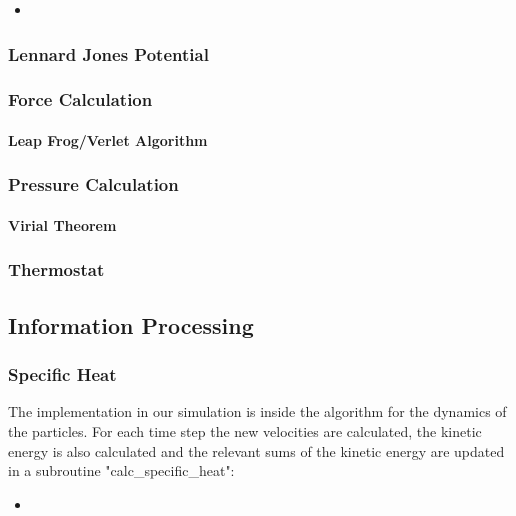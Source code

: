\documentclass[
10pt, %
a4paper, %
oneside, %
headinclude,footinclude, %
BCOR5mm, %
]{scrartcl}
\newcommand{\insertcode}[2]{\begin{itemize}\item[]\end{itemize}} %
\begin{document}
\insertcode{"Scripts/boundary_conditions_snippet_1.f90"}{Creating periodic boundary conditions} %





\subsubsection{Lennard Jones Potential}

 
\subsubsection{Force Calculation}

\paragraph{Leap Frog/Verlet Algorithm}

\subsubsection{Pressure Calculation}

\paragraph{Virial Theorem}

\subsubsection{Thermostat}

\subsection{Information Processing}

\subsubsection{Specific Heat}

The implementation in our simulation is inside the algorithm for the dynamics of the particles. For each time step the new velocities are calculated, the kinetic energy is also calculated and the relevant sums of the kinetic energy are updated in a subroutine "calc\_specific\_heat":

\insertcode{"Scripts/specific_heat_snippet_1.f90"}{Updating the relevant sums of the kinetic energy} %
\end{document}
